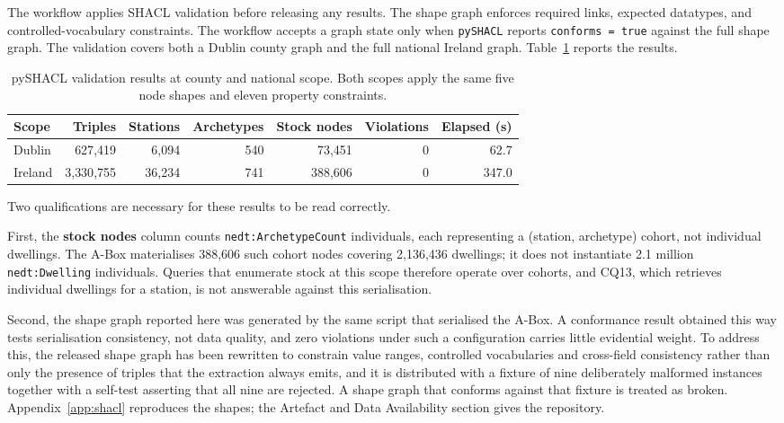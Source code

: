 \documentclass[preprint,12pt]{elsarticle}
\begin{document}
The workflow applies SHACL validation before releasing any results.
The shape graph enforces required links, expected datatypes, and
controlled-vocabulary constraints.
The workflow accepts a graph state only when \texttt{pySHACL} reports
\texttt{conforms = true} against the full shape graph.
The validation covers both a Dublin county graph and the full national
Ireland graph.
Table~\ref{tab:shacl_validation} reports the results.

\begin{table}[H]
\centering
\caption{pySHACL validation results at county and national scope.
  Both scopes apply the same five node shapes and eleven property
  constraints.}
\label{tab:shacl_validation}
\small
\begin{tabular}{lrrrrrr}
\toprule
\textbf{Scope} & \textbf{Triples} & \textbf{Stations} &
\textbf{Archetypes} & \textbf{Stock nodes} &
\textbf{Violations} & \textbf{Elapsed (s)} \\
\midrule
Dublin  &   627{,}419 & 6{,}094 & 540 &  73{,}451 & 0 &  62.7 \\
Ireland & 3{,}330{,}755 & 36{,}234 & 741 & 388{,}606 & 0 & 347.0 \\
\bottomrule
\end{tabular}
\end{table}

Two qualifications are necessary for these results to be read correctly.

First, the \textbf{stock nodes} column counts
\texttt{nedt:ArchetypeCount} individuals, each representing a
(station, archetype) cohort, not individual dwellings. The A-Box
materialises 388,606 such cohort nodes covering 2,136,436 dwellings; it
does not instantiate 2.1 million \texttt{nedt:Dwelling} individuals. Queries
that enumerate stock at this scope therefore operate over cohorts, and
CQ13, which retrieves individual dwellings for a station, is not answerable
against this serialisation.

Second, the shape graph reported here was generated by the same script that
serialised the A-Box. A conformance result obtained this way tests
serialisation consistency, not data quality, and zero violations under such
a configuration carries little evidential weight. To address this, the
released shape graph has been rewritten to constrain value ranges,
controlled vocabularies and cross-field consistency rather than only the
presence of triples that the extraction always emits, and it is distributed
with a fixture of nine deliberately malformed instances together with a
self-test asserting that all nine are rejected. A shape graph that conforms
against that fixture is treated as broken. Appendix~\ref{app:shacl}
reproduces the shapes; the Artefact and Data Availability section gives
the repository.
\end{document}

